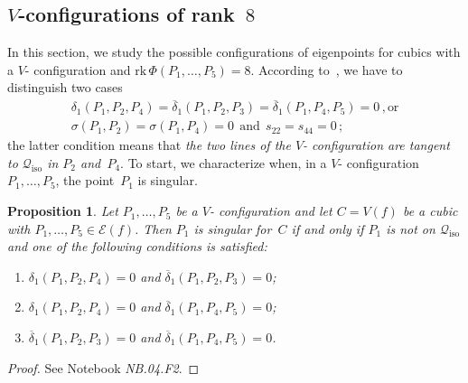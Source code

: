 \documentclass[a4paper, 11pt, reqno]{amsart}
\theoremstyle{plain}
\newtheorem{prop}[lemma]{Proposition}
\theoremstyle{definition}
\newcommand{\nb}[2]{\textsl{{NB}.{#1}.{#2}}}
\newcommand{\rk}{\ensuremath{\mathrm{rk}}}
\newcommand{\iso}{\mathcal{Q}_{\mathrm{iso}}}
\newcommand{\Eig}[1]{\mathcal{E}\!\left( {#1} \right)}
\begin{document}
\subsection{\texorpdfstring{$V$}{V}-configurations of rank~\texorpdfstring{$8$}{8}}
\label{rank_8}
%
In this section, we study the possible configurations of
eigenpoints for cubics with a $V$- configuration
and $\rk \, \Phi(P_1, \dots, P_5) = 8$. According
to~, we have to distinguish two cases
%
\begin{gather}
  \delta_1(P_1, P_2, P_4)=\overline{\delta}_1(P_1, P_2, P_3) =
  \overline{\delta}_1(P_1, P_4, P_5) = 0 \,, \text{or} 
  \label{rk8_1} \\
  \sigma(P_1, P_2) = \sigma(P_1, P_4) = 0 \ \ \mbox{and} \ \ s_{22} = s_{44} = 0 \,;
  \label{rk8_2}
\end{gather}
%
the latter condition means that \emph{the two lines of
the $V$- configuration are tangent to $\iso$ in $P_2$ and~$P_4$}.
%
To start, we characterize when, in a $V$- configuration
$P_1, \dotsc, P_5$, the point~$P_1$ is singular.

\begin{prop}
\label{proposition:P1_sing}
Let $P_1, \dots, P_5$ be a $V$- configuration and let
$C = V(f)$ be a cubic with
$P_1, \dots, P_5\in \Eig{f}$. Then $P_1$ is
singular for~$C$ if
and only if $P_1$ is not on $\iso$ and one of the following conditions
is satisfied:
%
\begin{enumerate}
  \item $\delta_1(P_1, P_2, P_4) = 0$ and $\overline{\delta}_1(P_1, P_2, P_3) = 0$;
  \item $\delta_1(P_1, P_2, P_4) = 0$ and $\overline{\delta}_1(P_1, P_4, P_5) = 0$;
  \item $\overline{\delta}_1(P_1, P_2, P_3) = 0$ and
  $\overline{\delta}_1(P_1, P_4, P_5) = 0$.
\end{enumerate}
%
\end{prop}
\begin{proof}
See Notebook \nb{04}{F2}.
\end{proof}
\end{document}
